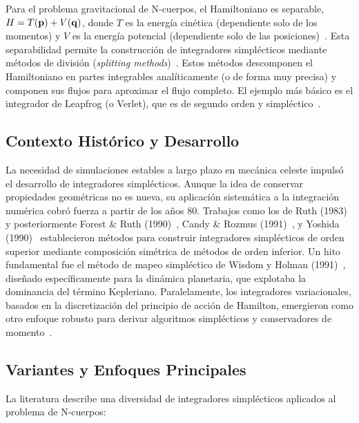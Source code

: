 Para el problema gravitacional de N-cuerpos, el Hamiltoniano es separable, \( H = T(\mathbf{p}) + V(\mathbf{q}) \), donde \( T \) es la energía cinética (dependiente solo de los momentos) y \( V \) es la energía potencial (dependiente solo de las posiciones)~\cite{chin2005, Hernandez2015}. Esta separabilidad permite la construcción de integradores simplécticos mediante métodos de división (\textit{splitting methods})~\cite{stuchi2002, chin2005}. Estos métodos descomponen el Hamiltoniano en partes integrables analíticamente (o de forma muy precisa) y componen sus flujos para aproximar el flujo completo. El ejemplo más básico es el integrador de Leapfrog (o Verlet), que es de segundo orden y simpléctico~\cite{stuchi2002, farr2007, Hernandez2015}.

\subsection{Contexto Histórico y Desarrollo}
La necesidad de simulaciones estables a largo plazo en mecánica celeste impulsó el desarrollo de integradores simplécticos. Aunque la idea de conservar propiedades geométricas no es nueva, su aplicación sistemática a la integración numérica cobró fuerza a partir de los años 80. Trabajos como los de Ruth (1983)~\cite{yoshida1990} y posteriormente Forest \& Ruth (1990)~\cite{yoshida1990}, Candy \& Rozmus (1991)~\cite{yoshida1993}, y Yoshida (1990)~\cite{farr2007, yoshida1993} establecieron métodos para construir integradores simplécticos de orden superior mediante composición simétrica de métodos de orden inferior. Un hito fundamental fue el método de mapeo simpléctico de Wisdom y Holman (1991)~\cite{wisdom1991}, diseñado específicamente para la dinámica planetaria, que explotaba la dominancia del término Kepleriano. Paralelamente, los integradores variacionales, basados en la discretización del principio de acción de Hamilton, emergieron como otro enfoque robusto para derivar algoritmos simplécticos y conservadores de momento~\cite{farr2007, Hernandez2015}.

\subsection{Variantes y Enfoques Principales}
La literatura describe una diversidad de integradores simplécticos aplicados al problema de N-cuerpos:

